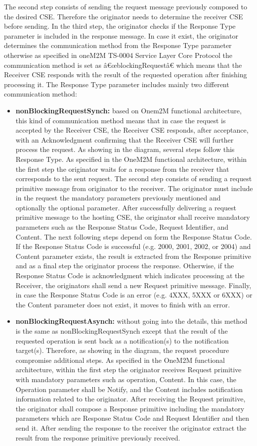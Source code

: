 The second step consists of sending the request message previously composed to the desired CSE. Therefore the originator needs to determine the receiver CSE before sending. 
In the third step, the originator checks if the Response Type parameter is included in the response message. In case it exist, the originator determines the communication method from the Response Type parameter otherwise as specified in oneM2M TS-0004 Service Layer Core Protocol the communication method is set as â€œblockingRequestâ€ which means that the Receiver CSE responds with the result of the requested operation after finishing processing it. The Response Type parameter includes mainly two different communication method:
\begin{itemize}
\item \textbf{nonBlockingRequestSynch:} based on Onem2M functional architecture, this kind of communication method means that in case the request is accepted by the Receiver CSE, the Receiver CSE responds, after acceptance, with an Acknowledgment confirming that the Receiver CSE will further process the request. As showing in the diagram, several steps follow this Response Type. As specified in the OneM2M functional architecture, within the first step the originator waits for a response from the receiver that corresponds to the sent request. The second step consists of sending a request primitive message from originator to the receiver. The originator must include in the request the mandatory parameters previously mentioned and optionally the optional parameter.  After successfully delivering a request primitive message to the hosting CSE, the originator shall receive mandatory parameters such as the Response Status Code, Request Identifier, and Content. The next following steps depend on form the Response Status Code. If the Response Status Code is successful (e.g. 2000, 2001, 2002, or 2004) and Content parameter exists, the result is extracted from the Response primitive and as a final step the originator process the response. Otherwise, if the Response Status Code is acknowledgment which indicates processing at the Receiver, the originators shall send a new Request primitive message. Finally, in case the Response Status Code is an error (e.g. 4XXX, 5XXX or 6XXX) or the Content parameter does not exist, it moves to finish with an error.
\item \textbf{nonBlockingRequestAsynch:} without going into the details, this method is the same as nonBlockingRequestSynch except that the result of the requested operation is sent back as a notification(s) to the notification target(s).  Therefore, as showing in the diagram, the request procedure compromise additional steps. As specified in the OneM2M functional architecture, within the first step the originator receives Request primitive with mandatory parameters such as operation, Content. In this case, the Operation parameter shall be Notify, and the Content includes notification information related to the originator.  After receiving the Request primitive, the originator shall compose a Response primitive including the mandatory parameters which are Response Status Code and Request Identifier and then send it. After sending the response to the receiver the originator extract the result from the response primitive previously received.

\end{itemize}
